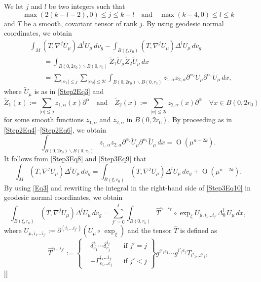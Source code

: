 \documentclass[reqno]{amsart}
\numberwithin{equation}{section}
\DeclareMathOperator{\bigO}{O}
\newcommand{\<}{\left<}
\renewcommand{\>}{\right>}
\renewcommand{\[}{\left[}
\renewcommand{\]}{\right]}
\renewcommand{\(}{\left(}
\renewcommand{\)}{\right)}
\begin{document}
\[\[\proof[Proof of Step~\ref{Step3}]
We let $j$ and $l$ be two integers such that 
$$\max\(2\(k-l-2\),0\)\le j\le k-l\quad\text{and}\quad\max\(k-4,0\)\le l\le k$$ 
and $T$ be a smooth, covariant tensor of rank $j$. By using geodesic normal coordinates, we obtain
\begin{align}\label{Step3Eq8}
&\int_M\(T,\nabla^jU_\mu\)\Delta^lU_\mu\,dv_g-\int_{B\(\xi,r_0\)}\(T,\nabla^jU_\mu\)\Delta^lU_\mu\,dv_g\nonumber\\
&\qquad=\int_{B\(0,2r_0\)\backslash B\(0,r_0\)}\widetilde{Z}_1\widetilde{U}_\mu\widetilde{Z}_2\widetilde{U}_\mu\,dx\nonumber\\
&\qquad=\sum_{\left|\alpha_1\right|\le j}\sum_{\left|\alpha_2\right|\le 2l}\int_{B\(0,2r_0\)\backslash B\(0,r_0\)} z_{1,\alpha}z_{2,\alpha}\partial^{\alpha_2}\widetilde{U}_\mu\partial^{\alpha_1}\widetilde{U}_\mu\,dx,
\end{align}
where $\widetilde{U}_\mu$ is as in \eqref{Step2Eq3} and
$$\widetilde{Z}_1\(x\):=\sum_{\left|\alpha\right|\le j}z_{1,\alpha}\(x\)\partial^{\alpha}\quad\text{and}\quad\widetilde{Z}_2\(x\):=\sum_{\left|\alpha\right|\le2l}z_{2,\alpha}\(x\)\partial^{\alpha}\quad\forall x\in B\(0,2r_0\)$$
for some smooth functions $z_{1,\alpha}$ and $z_{2,\alpha}$ in $B\(0,2r_0\)$. By proceeding as in \eqref{Step2Eq4}--\eqref{Step2Eq6}, we obtain
\begin{equation}\label{Step3Eq9}
\int_{B\(0,2r_0\)\backslash B\(0,r_0\)} z_{1,\alpha}z_{2,\alpha}\partial^{\alpha_2}\widetilde{U}_\mu\partial^{\alpha_1}\widetilde{U}_\mu\,dx=\bigO\(\mu^{n-2k}\).
\end{equation}
It follows from \eqref{Step3Eq8} and \eqref{Step3Eq9} that
\begin{equation}\label{Step3Eq10}
\int_M\(T,\nabla^jU_\mu\)\Delta^lU_\mu\,dv_g=\int_{B\(\xi,r_0\)}\(T,\nabla^jU_\mu\)\Delta^lU_\mu\,dv_g+\bigO\(\mu^{n-2k}\).
\end{equation}
By using \eqref{Eq3} and rewriting the integral in the right-hand side of \eqref{Step3Eq10} in geodesic normal coordinates, we obtain
\begin{equation}\label{Step3Eq11}
\int_{B\(\xi,r_0\)}\(T,\nabla^jU_\mu\)\Delta^lU_\mu\,dv_g=\sum_{j'=0}^j\int_{B\(0,r_0\)}\widehat{T}^{i_1\dotsc i_{j'}}\circ\exp_\xi U_{\mu,i_1\dotsc i_{j'}}\Delta_0^l\,U_\mu\,dx,
\end{equation}
where $U_{\mu,i_1\dotsc i_{j'}}:=\partial^{(i_1\dotsc i_{j'})}\(U_\mu\circ\,\exp_\xi\)$ and the tensor $\widehat{T}$ is defined as
$$\widehat{T}^{i_1\dotsc i_{j'}}:=\left\{\begin{aligned}&\delta^{i_1}_{e_1}\dotsm\delta^{i_j}_{e_j}&&\text{if }j'=j\\&-\Gamma^{i_1\dotsc i_{j'}}_{e_1\dotsc e_j}&&\text{if }j'<j\end{aligned}\right\}g^{i'_1e_1}\dotsm g^{i'_je_j}T_{i'_1\dotsc i'_j},$$
\]\]
\end{document}
